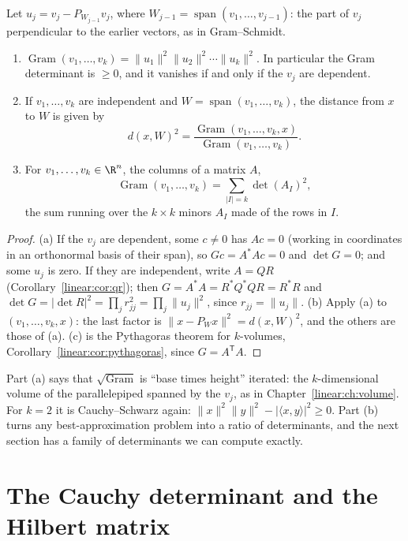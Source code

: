 \begin{theorem}\label{linear:thm:gram}
Let $u_j=v_j-P_{W_{j-1}}v_j$, where $W_{j-1}=\operatorname{span}(v_1,\dots,v_{j-1})$: the part of $v_j$ perpendicular to
the earlier vectors, as in Gram--Schmidt.
\begin{enumerate}[label=(\alph*)]
\item $\operatorname{Gram}(v_1,\dots,v_k)=\|u_1\|^2\|u_2\|^2\cdots\|u_k\|^2$. In particular the Gram determinant is
$\ge0$, and it vanishes if and only if the $v_j$ are dependent.
\item If $v_1,\dots,v_k$ are independent and $W=\operatorname{span}(v_1,\dots,v_k)$, the distance from $x$ to $W$ is given
by
\[
d(x,W)^2=\frac{\operatorname{Gram}(v_1,\dots,v_k,x)}{\operatorname{Gram}(v_1,\dots,v_k)}.
\]
\item For $v_1,\dots,v_k\in\R^n$, the columns of a matrix $A$,
\[
\operatorname{Gram}(v_1,\dots,v_k)=\sum_{|I|=k}\det(A_I)^2,
\]
the sum running over the $k\times k$ minors $A_I$ made of the rows in $I$.
\end{enumerate}
\end{theorem}
\begin{proof}
(a) If the $v_j$ are dependent, some $c\ne0$ has $Ac=0$ (working in coordinates in an orthonormal basis of their span),
so $Gc=A^*Ac=0$ and $\det G=0$; and some $u_j$ is zero. If they are independent, write $A=QR$ (Corollary~\ref{linear:cor:qr});
then $G=A^*A=R^*Q^*QR=R^*R$ and $\det G=|\det R|^2=\prod_jr_{jj}^2=\prod_j\|u_j\|^2$, since $r_{jj}=\|u_j\|$.
(b) Apply (a) to $(v_1,\dots,v_k,x)$: the last factor is $\|x-P_Wx\|^2=d(x,W)^2$, and the others are those of (a).
(c) is the Pythagoras theorem for $k$-volumes, Corollary~\ref{linear:cor:pythagoras}, since $G=A^{\mathsf T}A$.
\end{proof}

Part (a) says that $\sqrt{\operatorname{Gram}}$ is ``base times height'' iterated: the $k$-dimensional volume of the
parallelepiped spanned by the $v_j$, as in Chapter~\ref{linear:ch:volume}. For $k=2$ it is Cauchy--Schwarz again:
$\|x\|^2\|y\|^2-|\langle x,y\rangle|^2\ge0$. Part (b) turns any best-approximation problem into a ratio of determinants,
and the next section has a family of determinants we can compute exactly.

\section{The Cauchy determinant and the Hilbert matrix}

